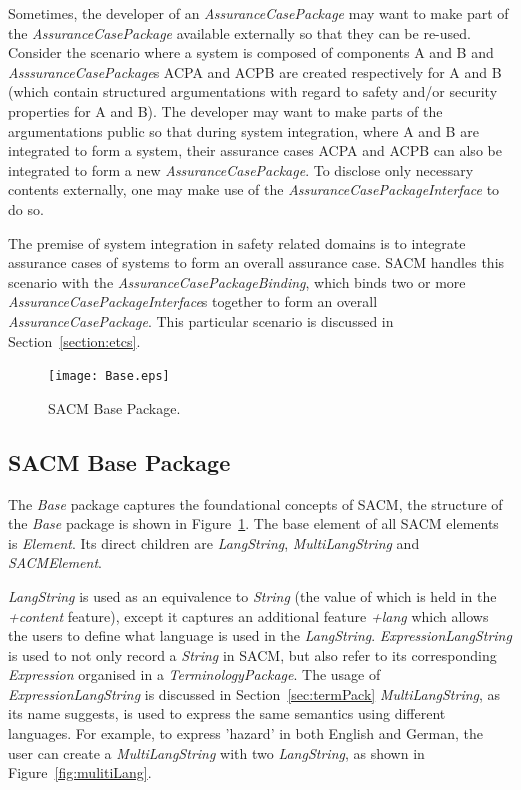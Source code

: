 Sometimes, the developer of an \textit{AssuranceCasePackage} may want to make part of the \textit{AssuranceCasePackage} available externally so that they can be re-used. Consider the scenario where a system is composed of components A and B and \textit{AsssuranceCasePackage}s ACPA and ACPB are created respectively for A and B (which contain structured argumentations with regard to safety and/or security properties for A and B). The developer may want to make parts of the argumentations public so that during system integration, where A and B are integrated to form a system, their assurance cases ACPA and ACPB can also be integrated to form a new \textit{AssuranceCasePackage}. To disclose only necessary contents externally, one may make use of the \textit{AssuranceCasePackageInterface} to do so. 

The premise of system integration in safety related domains is to integrate assurance cases of systems to form an overall assurance case. SACM handles this scenario with the \textit{AssuranceCasePackageBinding}, which binds two or more \textit{AssuranceCasePackageInterface}s together to form an overall \textit{AssuranceCasePackage}. This particular scenario is discussed in Section~\ref{section:etcs}.
\begin{figure}
	\centering
	\texttt{[image: Base.eps]}
	\caption{SACM Base Package.}
	\label{fig:base}
\end{figure}

\subsection{SACM Base Package}
\label{sec:basePack}

The \textit{Base} package captures the foundational concepts of SACM, the structure of the \textit{Base} package is shown in Figure~\ref{fig:base}. The base element of all SACM elements is \textit{Element}. Its direct children are \textit{LangString}, \textit{MultiLangString} and \textit{SACMElement}.

\textit{LangString} is used as an equivalence to \textit{String} (the value of which is held in the \textit{+content} feature), except it captures an additional feature \textit{+lang} which allows the users to define what language is used in the \textit{LangString}. \textit{ExpressionLangString} is used to not only record a \textit{String} in SACM, but also refer to its corresponding \textit{Expression} organised in a \textit{TerminologyPackage}. The usage of \textit{ExpressionLangString} is discussed in Section~\ref{sec:termPack} \textit{MultiLangString}, as its name suggests, is used to express the same semantics using different languages. For example, to express 'hazard' in both English and German, the user can create a \textit{MultiLangString} with two \textit{LangString}, as shown in Figure~\ref{fig:mulitiLang}.

